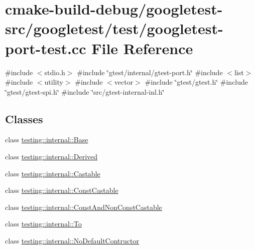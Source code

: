 \hypertarget{googletest-port-test_8cc}{}\section{cmake-\/build-\/debug/googletest-\/src/googletest/test/googletest-\/port-\/test.cc File Reference}
\label{googletest-port-test_8cc}
{\ttfamily \#include $<$stdio.\+h$>$}\newline
{\ttfamily \#include \char`\"{}gtest/internal/gtest-\/port.\+h\char`\"{}}\newline
{\ttfamily \#include $<$list$>$}\newline
{\ttfamily \#include $<$utility$>$}\newline
{\ttfamily \#include $<$vector$>$}\newline
{\ttfamily \#include \char`\"{}gtest/gtest.\+h\char`\"{}}\newline
{\ttfamily \#include \char`\"{}gtest/gtest-\/spi.\+h\char`\"{}}\newline
{\ttfamily \#include \char`\"{}src/gtest-\/internal-\/inl.\+h\char`\"{}}\newline
\subsection*{Classes}
\begin{DoxyCompactItemize}
\item 
class \mbox{\hyperlink{classtesting_1_1internal_1_1Base}{testing\+::internal\+::\+Base}}
\item 
class \mbox{\hyperlink{classtesting_1_1internal_1_1Derived}{testing\+::internal\+::\+Derived}}
\item 
class \mbox{\hyperlink{classtesting_1_1internal_1_1Castable}{testing\+::internal\+::\+Castable}}
\item 
class \mbox{\hyperlink{classtesting_1_1internal_1_1ConstCastable}{testing\+::internal\+::\+Const\+Castable}}
\item 
class \mbox{\hyperlink{classtesting_1_1internal_1_1ConstAndNonConstCastable}{testing\+::internal\+::\+Const\+And\+Non\+Const\+Castable}}
\item 
class \mbox{\hyperlink{classtesting_1_1internal_1_1To}{testing\+::internal\+::\+To}}
\item 
class \mbox{\hyperlink{classtesting_1_1internal_1_1NoDefaultContructor}{testing\+::internal\+::\+No\+Default\+Contructor}}
\end{DoxyCompactItemize}
